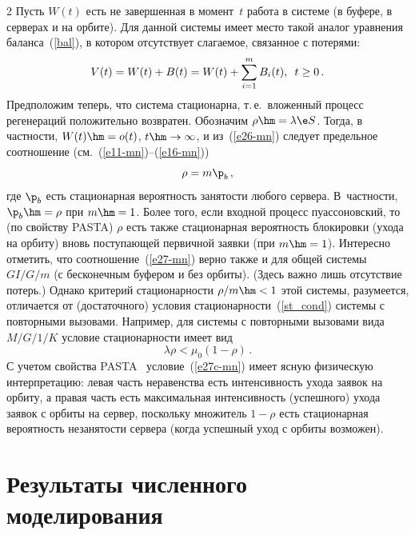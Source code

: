 \begin{multicols}{2}
\noindent
Пусть    $W(t)$
 есть не завершенная  в момент~$t$ работа в системе (в буфере, в серверах  и на
 орбите). Для данной  сис\-те\-мы имеет место такой аналог уравнения баланса~(\ref{bal}), 
 в котором отсутствует слагаемое, связанное с потерями:
\begin{equation}
V(t)=W(t)+B(t)=W(t)+\sum\limits_{i=1}^mB_i(t),\enskip t\ge0\,.
\label{e26-mn}
\end{equation}
Предположим теперь, что система стационарна, т.\,е.\ вложенный процесс
регенераций положительно возвратен. Обозначим $\rho\hm=\lambda\e S$.
Тогда, в част\-ности, $W(t)\hm=o(t)$, $t\hm\to \infty$, и из~(\ref{e26-mn})
следует  предельное соотношение (см.~(\ref{e11-mn})--(\ref{e16-mn}))
\begin{equation}
\rho= m \p_b\,,
\label{e27-mn}
\end{equation}
где $\p_b$ есть стационарная вероятность занятости любого сервера. В~част\-ности, $\p_b\hm=\rho$ 
при $m\hm =1$. Более того, если входной процесс
пуассоновский, то (по свойству PASTA)  $\rho$ есть  также
стационарная вероятность  блокировки (ухода на орбиту) вновь
поступающей первичной заявки (при $m\hm=1$).  Интересно отметить, что
соотношение~(\ref{e27-mn}) верно также и для общей сис\-те\-мы $GI/G/m$  (с
бесконечным буфером и без орбиты). (Здесь важно лишь отсутствие
потерь.) Однако критерий  стационарности $\rho/m\hm<1$ этой сис\-те\-мы,
разумеется, отличается от (достаточного) условия стационарности~(\ref{st_cond}) сис\-те\-мы 
с повторными вызовами.  Например, для
системы с повторными вызовами вида $M/G/1/K$ условие  стационарности
имеет вид
\begin{equation}
\lambda \rho<\mu_0\left(1-\rho\right)\,. 
\label{e27c-mn}
\end{equation}
С учетом свойства PASTA~\cite{Asmus} условие~(\ref{e27c-mn}) имеет
ясную физическую интерпретацию: левая часть неравенства есть
интенсивность ухода заявок на орбиту, а правая часть есть
максимальная интенсивность (успешного) ухода заявок с орбиты на
сервер, поскольку множитель $1-\rho$ есть стационарная вероятность
незанятости сервера (когда  успешный уход с орбиты возможен).






\section{Результаты численного  моделирования} 


\end{multicols}
